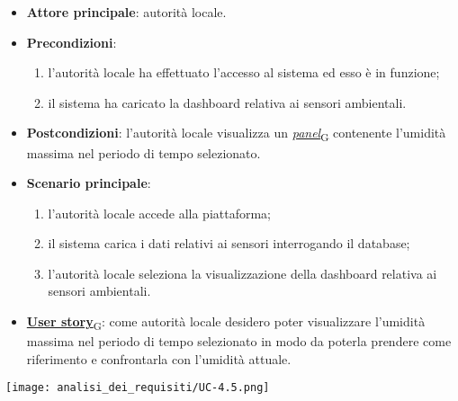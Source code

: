 \begin{itemize}
	\item \textbf{Attore principale}: autorità locale.
	\item \textbf{Precondizioni}:
	      \begin{enumerate}
		      \item l'autorità locale ha effettuato l'accesso al sistema ed esso è in funzione;
		      \item il sistema ha caricato la dashboard relativa ai sensori ambientali.
	      \end{enumerate}
	\item \textbf{Postcondizioni}: l'autorità locale visualizza un \href{https://7last.github.io/docs/pb/documentazione-interna/glossario\#panel}{\textit{panel}\textsubscript{G}} contenente l'umidità massima nel periodo di tempo selezionato.
	\item \textbf{Scenario principale}:
	      \begin{enumerate}
		      \item l'autorità locale accede alla piattaforma;
		      \item il sistema carica i dati relativi ai sensori interrogando il database;
		      \item l'autorità locale seleziona la visualizzazione della dashboard relativa ai sensori ambientali.
	      \end{enumerate}
	\item \href{https://7last.github.io/docs/pb/documentazione-interna/glossario\#user-story}{\textbf{User story}\textsubscript{G}}:
	      come autorità locale desidero poter visualizzare l'umidità massima nel periodo di tempo selezionato
	      in modo da poterla prendere come riferimento e confrontarla con l'umidità attuale.
\end{itemize}
\begin{center}
	\texttt{[image: analisi\_dei\_requisiti/UC-4.5.png]}
\end{center}


